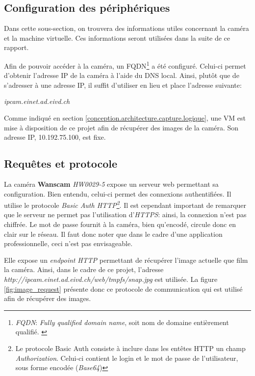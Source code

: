 \subsection{Configuration des périphériques}
Dans cette sous-section, on trouvera des informations utiles concernant la caméra et la machine virtuelle. Ces informations seront utilisées dans la suite de ce rapport. 

Afin de pouvoir accéder à la caméra, un FQDN\footnote{\textit{FQDN}: \textit{Fully qualified domain name}, soit nom de domaine entièrement qualifié. \autocite{wiki:FQDN}} a été configuré. Celui-ci permet d'obtenir l'adresse IP de la caméra à l'aide du DNS local. Ainsi, plutôt que de s'adresser à une adresse IP, il suffit d'utiliser en lieu et place l'adresse suivante:
\begin{center}
    \textit{ipcam.einet.ad.eivd.ch}
\end{center}


Comme indiqué en section \ref{conception.architecture.capture.logique}, une VM est mise à disposition de ce projet afin de récupérer des images de la caméra. Son adresse IP, 10.192.75.100, est fixe.

\subsection{Requêtes et protocole}
La caméra \textbf{Wanscam} \textit{HW0029-5} expose un serveur web permettant sa configuration. Bien entendu, celui-ci permet des connexions authentifiées. Il utilise le protocole \textit{Basic Auth HTTP\footnote{Le protocole Basic Auth consiste à inclure dans les entêtes HTTP un champ \textit{Authorization}. Celui-ci contient le login et le mot de passe de l'utilisateur, sous forme encodée (\textit{Base64})}}\autocite{wiki:basic-auth}. Il est cependant important de remarquer que le serveur ne permet pas l'utilisation d'\textit{HTTPS}: ainsi, la connexion n'est pas chiffrée. Le mot de passe fournit à la caméra, bien qu'encodé, circule donc en clair sur le réseau. Il faut donc noter que dans le cadre d'une application professionnelle, ceci n'est pas envisageable.

Elle expose un \textit{endpoint} \textit{HTTP} permettant de récupérer l'image actuelle que film la caméra. Ainsi, dans le cadre de ce projet, l'adresse \textit{http://ipcam.einet.ad.eivd.ch/web/tmpfs/snap.jpg} est utilisée. La figure \ref{fig:image_request} présente donc ce protocole de communication qui est utilisé afin de récupérer des images.

